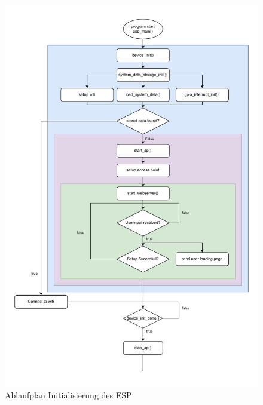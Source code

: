 \begin{figure}[H]
	\centering
	\vspace{0pt} %
	\includegraphics[width=1.1\textwidth, height=0.95\textheight, keepaspectratio]{./img/ESP_PAP.drawio.pdf}
	\caption{Ablaufplan Initialisierung des ESP}
	\label{fig:pap_esp32}
\end{figure}
\newpage

